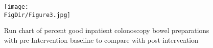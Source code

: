 \hypertarget{Run chart of percent good inpatient colonoscopy bowel preparations with pre-Intervention baseline to compare with post-intervention}{}
\begin{figure}
    \centerline{\texttt{[image: \\FigDir/Figure3.jpg]}}
    \caption{Run chart of percent good inpatient colonoscopy bowel preparations with pre-Intervention baseline to compare with post-intervention}
    \label{fig:runchart}
\end{figure} 